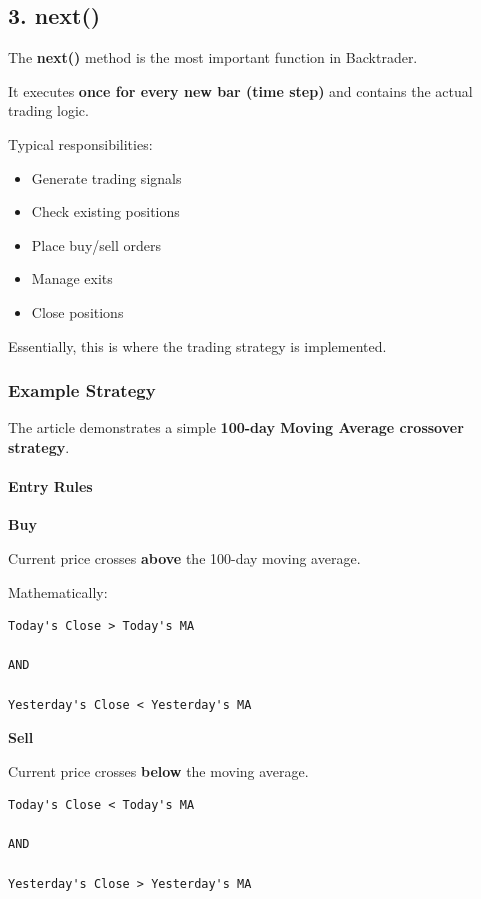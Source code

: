 \documentclass[12pt,openany]{book}
\begin{document}
\subsection{3. next()}

The \textbf{next()} method is the most important function in Backtrader.

It executes \textbf{once for every new bar (time step)} and contains the actual trading logic.

Typical responsibilities:

\begin{itemize}[leftmargin=*]
    \item Generate trading signals
    \item Check existing positions
    \item Place buy/sell orders
    \item Manage exits
    \item Close positions
\end{itemize}

Essentially, this is where the trading strategy is implemented.

\subsubsection{Example Strategy}

The article demonstrates a simple \textbf{100-day Moving Average crossover strategy}.

\paragraph{Entry Rules}

\textbf{Buy}

Current price crosses \textbf{above} the 100-day moving average.

Mathematically:

\begin{Verbatim}[breaklines=true,breakanywhere=true,fontsize=\small]
Today's Close > Today's MA

AND

Yesterday's Close < Yesterday's MA
\end{Verbatim}

\textbf{Sell}

Current price crosses \textbf{below} the moving average.

\begin{Verbatim}[breaklines=true,breakanywhere=true,fontsize=\small]
Today's Close < Today's MA

AND

Yesterday's Close > Yesterday's MA
\end{Verbatim}
\end{document}
